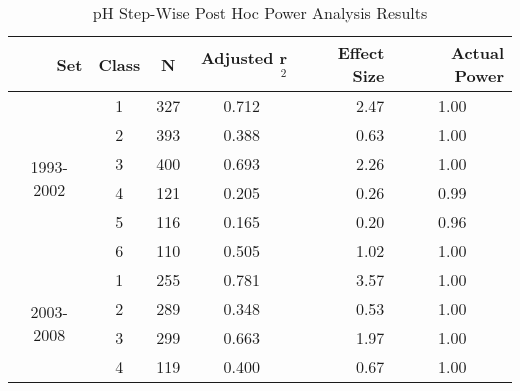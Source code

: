 \begin{table}[htbp]
  \centering
	\caption{pH Step-Wise Post Hoc Power Analysis Results}
    \begin{tabular}{rrcrrr}
    \toprule
    Set   & Class & N     & Adjusted r$^2$ & Effect Size & Actual Power \\
    \midrule
    \multicolumn{1}{c}{\multirow{6}[1]{*}{\begin{sideways}1993-2002\end{sideways}}} & \multicolumn{1}{c}{1} & \multicolumn{1}{c}{327} & \multicolumn{1}{c}{0.712} & \multicolumn{1}{r}{2.47 } & \multicolumn{1}{c}{1.00 } \\
    \multicolumn{1}{c}{} & \multicolumn{1}{c}{2} & \multicolumn{1}{c}{393} & \multicolumn{1}{c}{0.388 } & \multicolumn{1}{r}{0.63 } & \multicolumn{1}{c}{1.00 } \\
    \multicolumn{1}{c}{} & \multicolumn{1}{c}{3} & \multicolumn{1}{c}{400} & \multicolumn{1}{c}{0.693 } & \multicolumn{1}{r}{2.26 } & \multicolumn{1}{c}{1.00 } \\
    \multicolumn{1}{c}{} & \multicolumn{1}{c}{4} & \multicolumn{1}{c}{121} & \multicolumn{1}{c}{0.205 } & \multicolumn{1}{r}{0.26 } & \multicolumn{1}{c}{0.99 } \\
    \multicolumn{1}{c}{} & \multicolumn{1}{c}{5} & \multicolumn{1}{c}{116} & \multicolumn{1}{c}{0.165 } & \multicolumn{1}{r}{0.20 } & \multicolumn{1}{c}{0.96 } \\
    \multicolumn{1}{c}{} & \multicolumn{1}{c}{6} & \multicolumn{1}{c}{110} & \multicolumn{1}{c}{0.505} & \multicolumn{1}{r}{1.02 } & \multicolumn{1}{c}{1.00 } \\\midrule
    \multicolumn{1}{c}{\multirow{6}[2]{*}{\begin{sideways}2003-2008\end{sideways}}} & \multicolumn{1}{c}{1} & \multicolumn{1}{c}{255} & \multicolumn{1}{c}{0.781 } & \multicolumn{1}{r}{3.57 } & \multicolumn{1}{c}{1.00 } \\
    \multicolumn{1}{c}{} & \multicolumn{1}{c}{2} & \multicolumn{1}{c}{289} & \multicolumn{1}{c}{0.348 } & \multicolumn{1}{r}{0.53 } & \multicolumn{1}{c}{1.00 } \\
    \multicolumn{1}{c}{} & \multicolumn{1}{c}{3} & \multicolumn{1}{c}{299} & \multicolumn{1}{c}{0.663 } & \multicolumn{1}{r}{1.97 } & \multicolumn{1}{c}{1.00 } \\
    \multicolumn{1}{c}{} & \multicolumn{1}{c}{4} & \multicolumn{1}{c}{119} & \multicolumn{1}{c}{0.400 } & \multicolumn{1}{r}{0.67 } & \multicolumn{1}{c}{1.00 } \\

\end{tabular}
\end{table}
